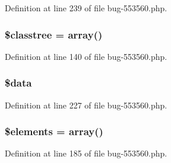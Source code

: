 \-Definition at line 239 of file bug-\/553560.\-php.

\hypertarget{classi_new_render_a91586855b939070da6b9129525ac9d55}{
\subsubsection[{\$classtree}]{\setlength{\rightskip}{0pt plus 5cm}\$classtree = array()}}\label{classi_new_render_a91586855b939070da6b9129525ac9d55}


\-Definition at line 140 of file bug-\/553560.\-php.

\hypertarget{classi_new_render_a6efc15b5a2314dd4b5aaa556a375c6d6}{
\subsubsection[{\$data}]{\setlength{\rightskip}{0pt plus 5cm}\$data}}\label{classi_new_render_a6efc15b5a2314dd4b5aaa556a375c6d6}


\-Definition at line 227 of file bug-\/553560.\-php.

\hypertarget{classi_new_render_ad18dd8fbe31b294e2bc4711dcde4548d}{
\subsubsection[{\$elements}]{\setlength{\rightskip}{0pt plus 5cm}\$elements = array()}}\label{classi_new_render_ad18dd8fbe31b294e2bc4711dcde4548d}


\-Definition at line 185 of file bug-\/553560.\-php.

